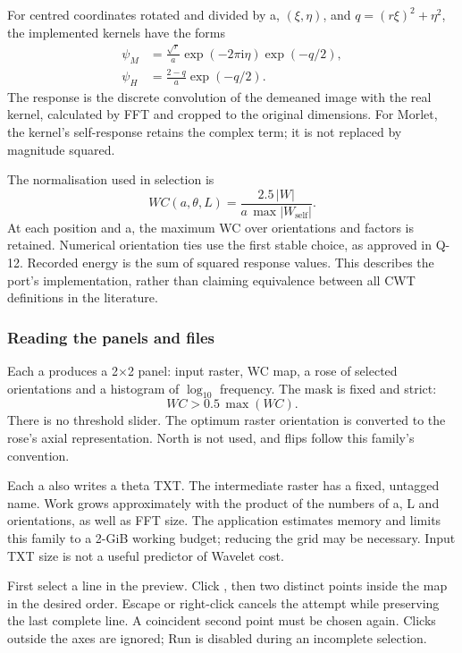 For centred coordinates rotated and divided by a, \((\xi,\eta)\), and \(q=(r\xi)^2+\eta^2\), the implemented kernels have the forms
\begin{align}
\psi_M&=\frac{\sqrt r}{a}\exp(-2\pi\mathrm i\eta)\exp(-q/2),\\
\psi_H&=\frac{2-q}{a}\exp(-q/2).
\end{align}
The response is the discrete convolution of the demeaned image with the real kernel, calculated by FFT and cropped to the original dimensions. For Morlet, the kernel's self-response retains the complex term; it is not replaced by magnitude squared.

The normalisation used in selection is
\begin{equation}
WC(a,\theta,L)=\frac{2.5\,|W|}{a\,\max|W_{\mathrm{self}}|}.
\end{equation}
At each position and a, the maximum WC over orientations and factors is retained. Numerical orientation ties use the first stable choice, as approved in Q-12. Recorded energy is the sum of squared response values. This describes the port's implementation, rather than claiming equivalence between all CWT definitions in the literature.

\subsubsection{Reading the panels and files}
Each a produces a 2\(\times\)2 panel: input raster, WC map, a rose of selected orientations and a histogram of \(\log_{10}\) frequency. The mask is fixed and strict:
\begin{equation}WC>0.5\,\max(WC).
\end{equation}
There is no threshold slider. The optimum raster orientation is converted to the rose's axial representation. North is not used, and flips follow this family's convention.

Each a also writes a theta TXT. The intermediate raster has a fixed, untagged name. Work grows approximately with the product of the numbers of a, L and orientations, as well as FFT size. The application estimates memory and limits this family to a 2-GiB working budget; reducing the grid may be necessary. Input TXT size is not a useful predictor of Wavelet cost.

\label{sec:graphs}
First select a line in the preview. Click , then two distinct points inside the map in the desired order. Escape or right-click cancels the attempt while preserving the last complete line. A coincident second point must be chosen again. Clicks outside the axes are ignored; Run is disabled during an incomplete selection.

